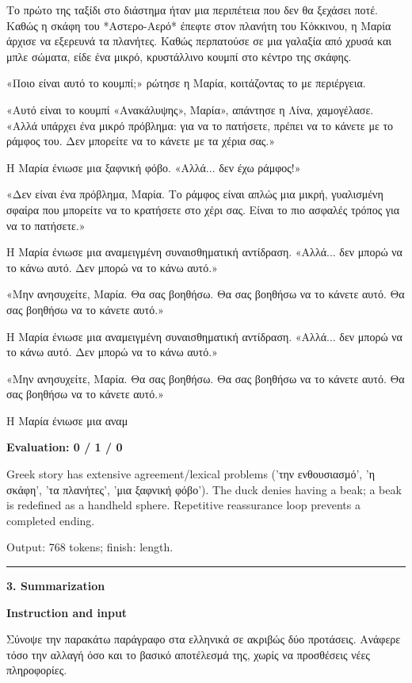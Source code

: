 \documentclass[10pt]{article}
\begin{document}
{\begin{minipage}{\textwidth}
\par\smallskip
Το πρώτο της ταξίδι στο διάστημα ήταν μια περιπέτεια που δεν θα ξεχάσει ποτέ. Καθώς η σκάφη του *Αστερο-Αερό* έπεφτε στον πλανήτη του Κόκκινου, η Μαρία άρχισε να εξερευνά τα πλανήτες. Καθώς περπατούσε σε μια γαλαξία από χρυσά και μπλε σώματα, είδε ένα μικρό, κρυστάλλινο κουμπί στο κέντρο της σκάφης.
\par\smallskip
«Ποιο είναι αυτό το κουμπί;» ρώτησε η Μαρία, κοιτάζοντας το με περιέργεια.
\par\smallskip
«Αυτό είναι το κουμπί «Ανακάλυψης», Μαρία», απάντησε η Λίνα, χαμογέλασε. «Αλλά υπάρχει ένα μικρό πρόβλημα: για να το πατήσετε, πρέπει να το κάνετε με το ράμφος του. Δεν μπορείτε να το κάνετε με τα χέρια σας.»
\par\smallskip
Η Μαρία ένιωσε μια ξαφνική φόβο. «Αλλά... δεν έχω ράμφος!»
\par\smallskip
«Δεν είναι ένα πρόβλημα, Μαρία. Το ράμφος είναι απλώς μια μικρή, γυαλισμένη σφαίρα που μπορείτε να το κρατήσετε στο χέρι σας. Είναι το πιο ασφαλές τρόπος για να το πατήσετε.»
\par\smallskip
Η Μαρία ένιωσε μια αναμειγμένη συναισθηματική αντίδραση. «Αλλά... δεν μπορώ να το κάνω αυτό. Δεν μπορώ να το κάνω αυτό.»
\par\smallskip
«Μην ανησυχείτε, Μαρία. Θα σας βοηθήσω. Θα σας βοηθήσω να το κάνετε αυτό. Θα σας βοηθήσω να το κάνετε αυτό.»
\par\smallskip
Η Μαρία ένιωσε μια αναμειγμένη συναισθηματική αντίδραση. «Αλλά... δεν μπορώ να το κάνω αυτό. Δεν μπορώ να το κάνω αυτό.»
\par\smallskip
«Μην ανησυχείτε, Μαρία. Θα σας βοηθήσω. Θα σας βοηθήσω να το κάνετε αυτό. Θα σας βοηθήσω να το κάνετε αυτό.»
\par\smallskip
Η Μαρία ένιωσε μια αναμ\par\smallskip
\textbf{Evaluation: 0 / 1 / 0}\par Greek story has extensive agreement/lexical problems ('την ενθουσιασμό', 'η σκάφη', 'τα πλανήτες', 'μια ξαφνική φόβο'). The duck denies having a beak; a beak is redefined as a handheld sphere. Repetitive reassurance loop prevents a completed ending.
\par {\color{gray} Output: 768 tokens; finish: length.}\par
\medskip\hrule\smallskip
{\bfseries 3. Summarization}\par\smallskip
\textbf{Instruction and input}\par Σύνοψε την παρακάτω παράγραφο στα ελληνικά σε ακριβώς δύο προτάσεις. Ανάφερε τόσο την αλλαγή όσο και το βασικό αποτέλεσμά της, χωρίς να προσθέσεις νέες πληροφορίες.

\end{minipage}}
\end{document}
